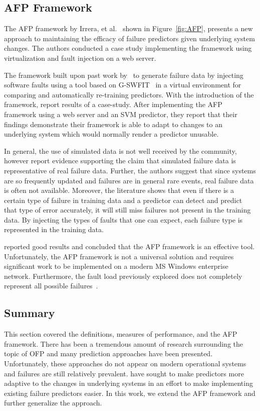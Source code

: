 \subsection{\ac{AFP} Framework} \label{afp}
The \ac{AFP} framework by Irrera, et al.~\cite{irrera2015} shown in
Figure~\ref{fig:AFP}, presents a new approach to maintaining the efficacy of
failure predictors given underlying system changes.  The authors conducted a
case study implementing the framework using virtualization and fault injection
on a web server.  


The framework built upon past work by~\citet{irrera2013,irrera2014} to generate
failure data by injecting software faults using a tool based on
\ac{G-SWFIT}~\citep{gswfit} in a virtual environment for comparing and
automatically re-training predictors.  With the introduction of the framework,
\citet{irrera2015} report results of a case-study.  After implementing the
\ac{AFP} framework using a web server and an \ac{SVM} predictor, they report
that their findings demonstrate their framework is able to adapt to changes to
an underlying system which would normally render a predictor unusable.

In general, the use of simulated data is not well received by the community,
however \citet{irrera2010,irrera2014} report evidence supporting the claim that
simulated failure data is representative of real failure data.  Further, the
authors suggest that since systems are so frequently updated and failures are
in general rare events, real failure data is often not available.  Moreover,
the literature shows that even if there is a certain type of failure in
training data and a predictor can detect and predict that type of error
accurately, it will still miss failures not present in the training data.  By
injecting the types of faults that one can expect, each failure type is
represented in the training data.

\citet{irrera2015} reported good results and concluded that the \ac{AFP}
framework is an effective tool.  Unfortunately, the \ac{AFP} framework is not a
universal solution and requires significant work to be implemented on a modern
\ac{MS} Windows enterprise network.  Furthermore, the fault load previously
explored does not completely represent all possible
failures~\citep{kikuchi2014}.

\subsection{Summary} \label{summary}
This section covered the definitions, measures of performance, and the \ac{AFP}
framework.  There has been a tremendous amount of research surrounding the
topic of \ac{OFP} and many prediction approaches have been presented.
Unfortunately, these approaches do not appear on modern operational systems and
failures are still relatively prevalent.  \citet{irrera2015} have sought to
make predictors more adaptive to the changes in underlying systems in an effort
to make implementing existing failure predictors easier.  In this work, we
extend the \ac{AFP} framework and further generalize the approach.  
